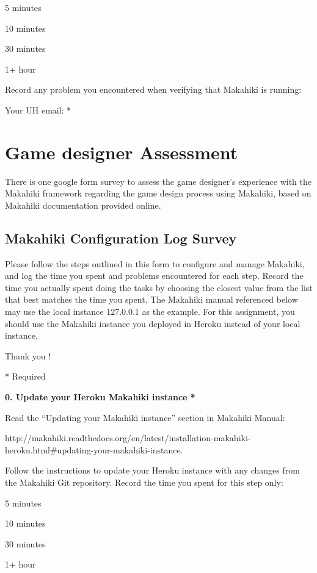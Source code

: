 \begin{radiobutton}
\item 5 minutes
\item  10 minutes
\item  30 minutes
\item  1+ hour
\end{radiobutton}

Record any problem you encountered when verifying that Makahiki is running: \underline{\hspace{3cm}}

Your UH email: * \underline{\hspace{4cm}}

\section{Game designer Assessment}

There is one google form survey to assess the game designer's experience with the Makahiki framework regarding the game design process using  Makahiki, based on Makahiki documentation provided online.

\subsection{Makahiki Configuration Log Survey}

Please follow the steps outlined in this form to configure and manage Makahiki, and log the time you spent and problems encountered for each step. Record the time you actually spent doing the tasks by choosing the closest value from the list that best matches the time you spent.
The Makahiki manual referenced below may use the local instance 127.0.0.1 as the example. For this assignment, you should use the Makahiki instance you deployed in Heroku instead of your local instance.

Thank you !

* Required

{\bf 0. Update your Heroku Makahiki instance *}

Read the ``Updating your Makahiki instance'' section in Makahiki Manual:

http://makahiki.readthedocs.org/en/latest/installation-makahiki-heroku.html\#updating-your-makahiki-instance. 

Follow the instructions to update your Heroku instance with any changes from the Makahiki Git repository. Record the time you spent for this step only:

\begin{radiobutton}
\item 5 minutes
\item  10 minutes
\item  30 minutes
\item  1+ hour
\end{radiobutton}

